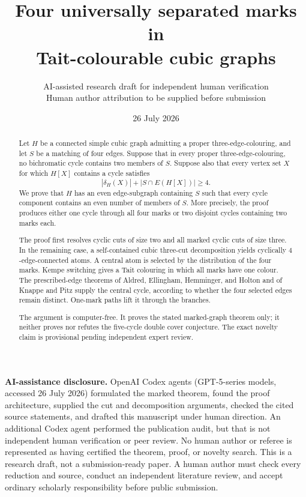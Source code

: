 \documentclass[11pt]{article}
\title{Four universally separated marks in\\
Tait-colourable cubic graphs}
\author{AI-assisted research draft for independent human verification\\
\small Human author attribution to be supplied before submission}
\date{26 July 2026}
\theoremstyle{definition}
\theoremstyle{remark}
\newcommand{\cut}{\delta}
\begin{document}
\maketitle

\noindent
\colorbox{yellow!22}{%
  \parbox{\dimexpr\linewidth-2\fboxsep\relax}{%
  \textbf{AI-assistance disclosure.}
  OpenAI Codex agents (GPT-5-series models, accessed 26 July 2026)
  formulated the marked theorem, found the proof architecture, supplied
  the cut and decomposition arguments, checked the cited source
  statements, and drafted this manuscript under human direction.
  An additional Codex agent performed the publication audit, but that is
  not independent human verification or peer review.  No human author or
  referee is represented as having certified the theorem, proof, or
  novelty search.  This is a research draft, not a submission-ready
  paper.  A human author must check every reduction and source, conduct
  an independent literature review, and accept ordinary scholarly
  responsibility before public submission.}}

\begin{abstract}
Let \(H\) be a connected simple cubic graph admitting a proper
three-edge-colouring, and let \(S\) be a matching of four edges.
Suppose that in every proper three-edge-colouring, no bichromatic cycle
contains two members of \(S\).  Suppose also that every vertex set
\(X\) for which \(H[X]\) contains a cycle satisfies
\[
 |\cut_H(X)|+|S\cap E(H[X])|\ge4.
\]
We prove that \(H\) has an even edge-subgraph containing \(S\) such that
every cycle component contains an even number of members of \(S\).
More precisely, the proof produces either one cycle through all four
marks or two disjoint cycles containing two marks each.

The proof first resolves cyclic cuts of size two and all marked cyclic
cuts of size three.  In the remaining case, a self-contained cubic
three-cut decomposition yields cyclically \(4\)-edge-connected atoms.
A central atom is selected by the distribution of the four marks.
Kempe switching gives a Tait colouring in which all marks have one
colour.  The prescribed-edge theorems of Aldred, Ellingham, Hemminger,
and Holton and of Knappe and Pitz supply the central cycle, according
to whether the four selected edges remain distinct.  One-mark paths
lift it through the branches.

The argument is computer-free.  It proves the stated marked-graph
theorem only; it neither proves nor refutes the five-cycle double cover
conjecture.  The exact novelty claim is provisional pending independent
expert review.
\end{abstract}
\end{document}
